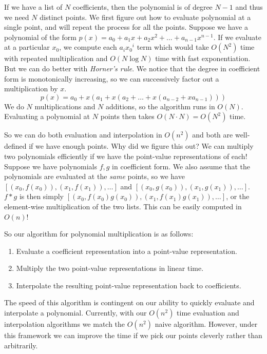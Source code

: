 \documentclass[11pt, oneside]{article}
\theoremstyle{plain}
\theoremstyle{definition}
\begin{document}
If we have a list of \( N \) coefficients, then the polynomial is of degree
\( N - 1 \) and thus we need \( N \) distinct points.
We first figure out how to evaluate polynomial at a single point,
and will repeat the process for all the points.
Suppose we have a polynomial of the form
\( p(x) = a_0 + a_1 x + a_2 x^2 + \dots + a_{n - 1} x^{n - 1} \). 
If we evaluate at a particular \( x_0 \), we compute each \( a_i {x_0}^i \) term
which would take \( O(N^2) \) time with repeated multiplication
and \( O(N \log N) \) time with fast exponentiation. 
But we can do better with \textit{Horner's rule}.
We notice that the degree in coefficient form is monotonically increasing,
so we can successively factor out a multiplication by \( x \).
\[ p(x) = a_0 + x (a_1 + x(a_2 + \dots + x(a_{n - 2} + x a_{n - 1}))) \] 
We do \( N \) multiplications and \( N \) additions, so the algorithm runs in
\( O(N) \). Evaluating a polynomial at \( N \) points then takes
\( O(N \cdot N) = O(N^2) \) time.

So we can do both evaluation and interpolation in \( O(n^2) \) and both are
well-defined if we have enough points. Why did we figure this out?
We can multiply two polynomials efficiently if we have the point-value
representations of each! Suppose we have polynomials \( f, g \) in
coefficient form. We also assume that the polynomials are evaluated at the
\textit{same} points, so we have \( [(x_0, f(x_0)), (x_1, f(x_1)), \dots ]\)
and \( [(x_0, g(x_0)), (x_1, g(x_1)), \dots ]\). \( f * g \) is then simply
\( [(x_0, f(x_0) g(x_0)), (x_1, f(x_1) g(x_1)), \dots] \), or the element-wise
multiplication of the two lists. This can be easily computed in \( O(n) \)!

So our algorithm for polynomial multiplication is as follows:
\begin{enumerate}
  \item Evaluate a coefficient representation into a point-value representation.
  \item Multiply the two point-value representations in linear time.
  \item Interpolate the resulting point-value
representation back to coefficients.
\end{enumerate}

The speed of this algorithm is contingent on our ability to quickly
evaluate and interpolate a polynomial. Currently, with our \( O(n^2) \) time
evaluation and interpolation algorithms we match the \( O(n^2) \) naive
algorithm. However, under this framework we can improve the time if we pick
our points cleverly rather than arbitrarily.
\end{document}
